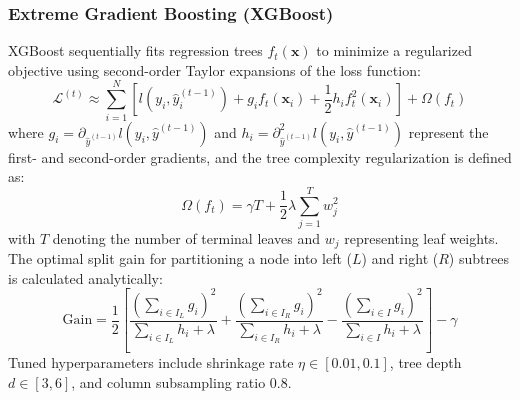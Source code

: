 \documentclass[conference]{IEEEtran}
\begin{document}
\subsubsection{Extreme Gradient Boosting (XGBoost)}
XGBoost \cite{chen2016} sequentially fits regression trees $f_t(\mathbf{x})$ to minimize a regularized objective using second-order Taylor expansions of the loss function:
\begin{equation}
\mathcal{L}^{(t)} \approx \sum_{i=1}^N \left[ l(y_i, \hat{y}_i^{(t-1)}) + g_i f_t(\mathbf{x}_i) + \frac{1}{2} h_i f_t^2(\mathbf{x}_i) \right] + \Omega(f_t)
\end{equation}
where $g_i = \partial_{\hat{y}^{(t-1)}} l(y_i, \hat{y}^{(t-1)})$ and $h_i = \partial_{\hat{y}^{(t-1)}}^2 l(y_i, \hat{y}^{(t-1)})$ represent the first- and second-order gradients, and the tree complexity regularization is defined as:
\begin{equation}
\Omega(f_t) = \gamma T + \frac{1}{2} \lambda \sum_{j=1}^T w_j^2
\end{equation}
with $T$ denoting the number of terminal leaves and $w_j$ representing leaf weights. The optimal split gain for partitioning a node into left ($L$) and right ($R$) subtrees is calculated analytically:
\begin{equation}
\text{Gain} = \frac{1}{2} \left[ \frac{(\sum_{i \in I_L} g_i)^2}{\sum_{i \in I_L} h_i + \lambda} + \frac{(\sum_{i \in I_R} g_i)^2}{\sum_{i \in I_R} h_i + \lambda} - \frac{(\sum_{i \in I} g_i)^2}{\sum_{i \in I} h_i + \lambda} \right] - \gamma
\end{equation}
Tuned hyperparameters include shrinkage rate $\eta \in [0.01, 0.1]$, tree depth $d \in [3, 6]$, and column subsampling ratio $0.8$.
\end{document}
